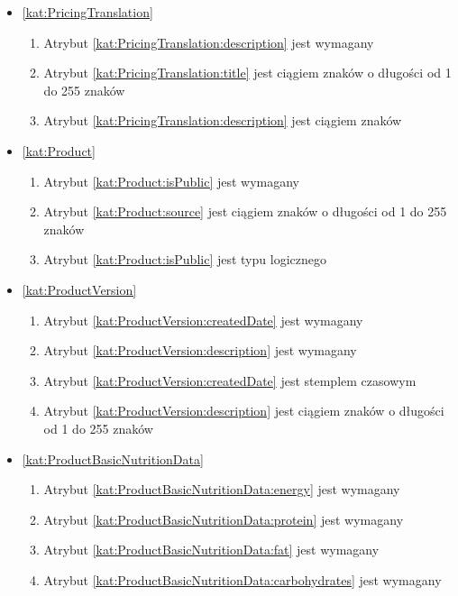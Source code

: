 \begin{itemize}[label={\textbf{Ograniczenia dla}}, wide, labelwidth=!, labelindent=0pt]
    \item\ref{kat:PricingTranslation}
    \begin{enumerate}[label={\textbf{OGR/\protect\threedigits{\arabic{enumi}}}}, wide, labelwidth=!, align=left, leftmargin=3cm, resume]
        \item Atrybut \ref{kat:PricingTranslation:description} jest wymagany

        \item Atrybut \ref{kat:PricingTranslation:title} jest ciągiem znaków o długości od 1 do 255 znaków
        \item Atrybut \ref{kat:PricingTranslation:description} jest ciągiem znaków
    \end{enumerate}

    \item\ref{kat:Product}
    \begin{enumerate}[label={\textbf{OGR/\protect\threedigits{\arabic{enumi}}}}, wide, labelwidth=!, align=left, leftmargin=3cm, resume]
        \item Atrybut \ref{kat:Product:isPublic} jest wymagany

        \item Atrybut \ref{kat:Product:source} jest ciągiem znaków o długości od 1 do 255 znaków
        \item Atrybut \ref{kat:Product:isPublic} jest typu logicznego
    \end{enumerate}

    \item\ref{kat:ProductVersion}
    \begin{enumerate}[label={\textbf{OGR/\protect\threedigits{\arabic{enumi}}}}, wide, labelwidth=!, align=left, leftmargin=3cm, resume]
        \item Atrybut \ref{kat:ProductVersion:createdDate} jest wymagany
        \item Atrybut \ref{kat:ProductVersion:description} jest wymagany

        \item Atrybut \ref{kat:ProductVersion:createdDate} jest stemplem czasowym
        \item Atrybut \ref{kat:ProductVersion:description} jest ciągiem znaków o długości od 1 do 255 znaków
    \end{enumerate}

    \item\ref{kat:ProductBasicNutritionData}
    \begin{enumerate}[label={\textbf{OGR/\protect\threedigits{\arabic{enumi}}}}, wide, labelwidth=!, align=left, leftmargin=3cm, resume]
        \item Atrybut \ref{kat:ProductBasicNutritionData:energy} jest wymagany
        \item Atrybut \ref{kat:ProductBasicNutritionData:protein} jest wymagany
        \item Atrybut \ref{kat:ProductBasicNutritionData:fat} jest wymagany
        \item Atrybut \ref{kat:ProductBasicNutritionData:carbohydrates} jest wymagany


\end{enumerate}
\end{itemize}
